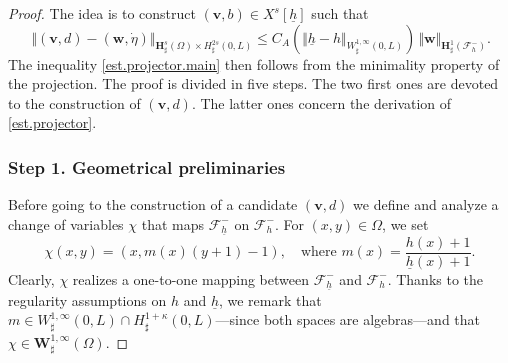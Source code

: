 \documentclass[10pt]{amsart}
\let\mathcal\mathscr
\theoremstyle{remark}
\theoremstyle{definition}
\newcommand{\norme}[1]{\,\Vert #1\Vert}
\newcommand{\vnorme}[1]{\Vert #1\Vert}
\newcommand{\vg}{\boldsymbol{v}}
\newcommand{\wg}{\boldsymbol{w}}
\newcommand{\BS}[1]{\boldsymbol{#1}}
\let\CM\Omega
\newcommand{\etap}{\dot{\eta}}
\newcommand{\hb}{{\underline{h}}}
\begin{document}
\begin{proof}
The idea is to construct $(\vg,b)\in X^{s}[\hb]$ such that
\begin{equation}\label{est.projector}
\norme{(\vg,d) -(\wg,\etap)}_{\BS{H}^{s}_{\sharp}(\CM)\times H^{2s}_{\sharp}(0,L)}\leq C_{A}(\vnorme{\hb -h }_{W^{1,\infty}_{\sharp}(0,L)})\norme{\wg}_{\BS{H}^{1}_{\sharp}(\mathcal{F}^{-}_{h})}.
\end{equation}
The inequality \eqref{est.projector.main} then follows from the minimality property of the projection.
The proof is divided in five steps. The two first ones are devoted to the construction of $(\vg,d)$. The latter ones
concern the derivation of \eqref{est.projector}.

\subsubsection*{Step 1. Geometrical preliminaries}
Before going to the construction of a candidate $(\vg,d)$ we define and analyze a change of variables
$\chi$ that maps $\mathcal{F}^-_{\hb}$ on $\mathcal{F}^-_{h}$. For $(x,y) \in \Omega$, we set
\[
\chi(x,y) = \left(x,m(x)(y+1)-1\right), \quad \text{where } m(x) = \frac{h(x)+1}{\hb(x)+1}.
\]
Clearly, $\chi$ realizes a one-to-one mapping between $\mathcal{F}^-_{\hb}$ and $\mathcal{F}^-_{h}$.
Thanks to the regularity assumptions on $h$ and $\hb$, we remark that $m\in W_\sharp^{1,\infty}(0, L)\cap H_\sharp^{1+\kappa}(0, L)$---since both spaces are algebras---and that $\chi \in \BS{W}_\sharp^{1, \infty}(\Omega)$.


\end{proof}
\end{document}
